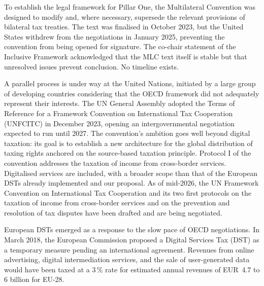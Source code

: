 \documentclass[../../main]{subfiles}
\begin{document}

To establish the legal framework for Pillar One, the Multilateral Convention was designed to modify and, where necessary, supersede the relevant provisions of bilateral tax treaties.
The text was finalised in October 2023, but the United States withdrew from the negotiations in January 2025, preventing the convention from being opened for signature.
The co-chair statement of the Inclusive Framework acknowledged that the MLC text itself is stable but that unresolved issues prevent conclusion.
No timeline exists.

A parallel process is under way at the United Nations, initiated by a large group of developing countries considering that the OECD framework did not adequately represent their interests.
The UN General Assembly adopted the Terms of Reference for a Framework Convention on International Tax Cooperation (UNFCITC) in December 2023, opening an intergovernmental negotiation expected to run until 2027.
The convention's ambition goes well beyond digital taxation: its goal is to establish a new architecture for the global distribution of taxing rights anchored on the source-based taxation principle.
Protocol I of the convention addresses the taxation of income from cross-border services. 
Digitalised services are included, with a broader scope than that of the European DSTs already implemented and our proposal.
As of mid-2026, the UN Framework Convention on International Tax Cooperation and its two first protocols on the taxation of income from cross-border services and on the prevention and resolution of tax disputes have been drafted and are being negotiated. 



European DSTs emerged as a response to the slow pace of OECD negotiations.
In March 2018, the European Commission proposed a Digital Services Tax (DST) as a temporary measure pending an international agreement.
Revenues from online advertising, digital intermediation services, and the sale of user-generated data would have been taxed at a 3\,\% rate for estimated annual revenues of EUR~4.7 to 6 billion for EU-28.
\end{document}

